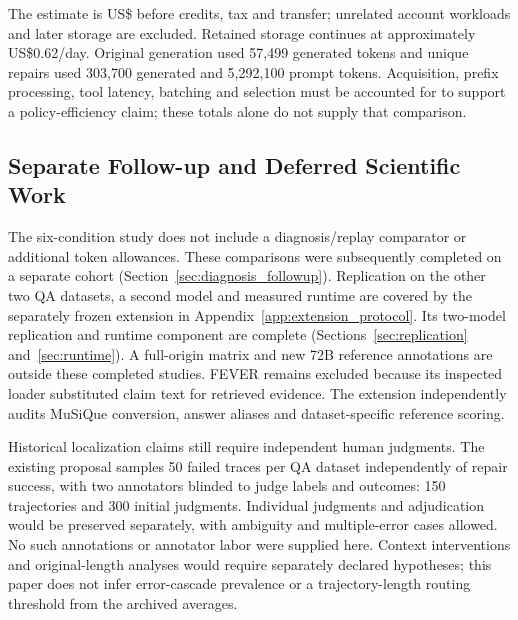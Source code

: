\documentclass{article}
\begin{document}
\begin{table}[h]
\centering
\caption{Estimated infrastructure usage through the recorded report cutoff.
This is not an AWS invoice or a matched-total-compute comparison.}
\label{tab:main_cost}
\small

\end{table}

The estimate is US\$\MainEstimatedUSD{} before credits, tax and transfer;
unrelated account workloads and later storage are excluded. Retained storage
continues at approximately US\$0.62/day. Original generation used 57,499
generated tokens and unique repairs used 303,700 generated and 5,292,100
prompt tokens. Acquisition, prefix processing, tool latency, batching and
selection must be accounted for to support a policy-efficiency claim;
these totals alone do not supply that comparison.

\subsection{Separate Follow-up and Deferred Scientific Work}
The six-condition study does not include a diagnosis/replay comparator or
additional token allowances. These comparisons were subsequently completed
on a separate cohort (Section~\ref{sec:diagnosis_followup}). Replication on
the other two QA datasets, a second model and measured runtime are covered
by the separately frozen extension in Appendix~\ref{app:extension_protocol}.
Its two-model replication and runtime component are complete
(Sections~\ref{sec:replication} and~\ref{sec:runtime}). A full-origin
matrix and new 72B reference annotations are outside these completed studies. FEVER
remains excluded because its inspected loader substituted claim text for
retrieved evidence. The extension independently audits MuSiQue conversion,
answer aliases and dataset-specific reference scoring.

Historical localization claims still require independent human judgments.
The existing proposal samples 50 failed traces per QA dataset independently
of repair success, with two annotators blinded to judge labels and outcomes:
150 trajectories and 300 initial judgments. Individual judgments and
adjudication would be preserved separately, with ambiguity and multiple-error
cases allowed. No such annotations or annotator labor were supplied here.
Context interventions and original-length analyses would require separately
declared hypotheses; this paper does not infer error-cascade prevalence or
a trajectory-length routing threshold from the archived averages.
\end{document}
